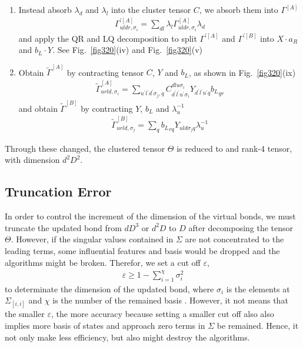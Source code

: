 \begin{enumerate}
	\item Instead absorb $\lambda_d$ and $\lambda_l$ into the cluster tensor $C$, we absorb them into $\Gamma^{[A]}$
		\begin{align}
			\Gamma^{\prime [A]}_{uldr,\sigma_i} = \sum_{dl}{\lambda_l \Gamma^{[A]}_{uldr,\sigma_i} \lambda_d}
		\end{align}
		and apply the QR and LQ decomposition to split $\Gamma^{\prime [A]}$ and $\Gamma^{\prime [B]}$ into $X\cdot a_R$ and $b_L \cdot Y$. See Fig.~\ref{fig320}(iv) and Fig.~\ref{fig320}(v) 
	\item Obtain $\widetilde{\Gamma}^{[A]}$ by contracting tensor $C$, $Y$ and $b_L$, as shown in Fig.~\ref{fig320}(ix)
		\begin{align}
			\widetilde{\Gamma}^{[A]}_{urld, \sigma_i} = \sum_{u^{\prime}l^{\prime}d^{\prime}\sigma_j,q}{C^{dlu\sigma_i}_{d^{\prime}l^{\prime}u^{\prime}\sigma_i}Y_{d^{\prime}l^{\prime}u^{\prime}q}{b_L}_{qr}}
		\end{align}
		and obtain $\widetilde{\Gamma}^{[B]}$ by contracting $Y$, $b_L$ and $\lambda_u^{-1}$
		\begin{align}
			\widetilde{\Gamma}^{[B]}_{urld,\sigma_j} = \sum_{q}{{b_L}_{rq}Y_{uld\sigma_j q}\lambda_u^{-1}}
		\end{align}
\end{enumerate}

Through these changed, the clustered tensor $\Theta$ is reduced to and rank-4 tensor, with dimension $d^2D^2$.

\subsection{Truncation Error}
In order to control the increment of the dimension of the virtual bonds, we must truncate the updated bond from $dD^3$ or $d^2D$ to $D$ after decomposing the tensor $\Theta$. However, if the singular values contained in $\Sigma$ are not concentrated to the leading terms, some influential features and basis would be dropped and the algorithms might be broken. Therefor, we set a cut off $\varepsilon$, 
\begin{align}
	\varepsilon \geq 1 - \sum_{i=1}^{\chi}{\sigma_i^2}
\end{align}
to determinate the dimension of the updated bond, where $\sigma_i$ is the elements at $\Sigma_{[i,i]}$ and $\chi$ is the number of the remained basis . However, it not means that the smaller $\varepsilon$, the more accuracy because setting a smaller cut off also also implies more basis of states and approach zero terms in $\Sigma$ be remained. Hence, it not only make less efficiency, but also might destroy the algorithms.

